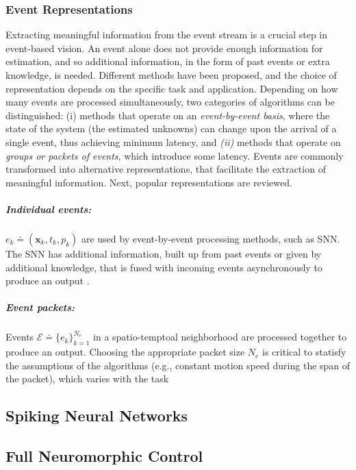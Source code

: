 \documentclass{article}
\begin{document}
\subsubsection{Event Representations}
Extracting meaningful information from the event stream is a crucial step in event-based vision. An event alone does not provide enough information for estimation, and so additional information, in the form of past events or extra knowledge, is needed. Different methods have been proposed, and the choice of representation depends on the specific task and application. Depending on how many events are processed simultaneously, two categories of algorithms can be distinguished: (i) methods that operate on an \textit{event-by-event basis}, where the state of the system (the estimated unknowns) can change upon the arrival of a single event, thus achieving minimum latency, and \textit{(ii)} methods that operate on \textit{groups or packets of events}, which introduce some latency. Events are commonly transformed into alternative representations, that facilitate the extraction of meaningful information. Next, popular representations are reviewed.

\subparagraph{Individual events:} $e_k \doteq (\textbf{x}_k,t_k,p_k)$ are used by event-by-event processing methods, such as SNN. The SNN has additional information, built up from past events or given by additional knowledge, that is fused with incoming events asynchronously to produce an output \cite{paredes-vallesUnsupervisedLearningHierarchical2020,paredes-vallesFullyNeuromorphicVision2023b}.

\subparagraph{Event packets:} Events $\mathcal{E} \doteq \{e_k\}^{N_e}_{k=1}$ in a spatio-temptoal neighborhood are processed together to produce an output. Choosing the appropriate packet size $N_e$ is critical to statisfy the assumptions of the algorithms (e.g., constant motion speed during the span of the packet), which varies with the task \cite{muegglerContinuousTimeVisualInertialOdometry2018, DenseContinuousTimeOptical, bhattacharyaMonocularEventBasedVision2024}







\subsection{Spiking Neural Networks}
\subsection{Full Neuromorphic Control}
\end{document}
